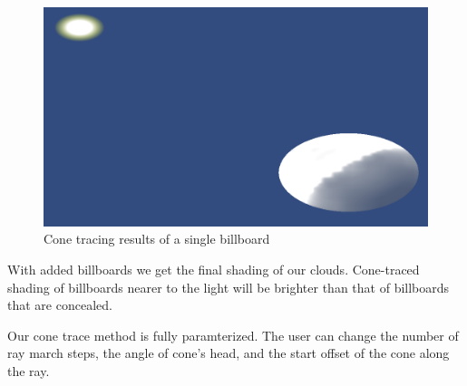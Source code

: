 \begin{figure}[h]
\centering
\includegraphics[width=\textwidth]{../res/conetrace.png}
\caption{Cone tracing results of a single billboard}
\end{figure}

With added billboards we get the final shading of our clouds. Cone-traced shading of billboards nearer to the light will be brighter than that of billboards that are concealed. 

Our cone trace method is fully paramterized. The user can change the number of ray march steps, the angle of cone's head, and the start offset of the cone along the ray. 

